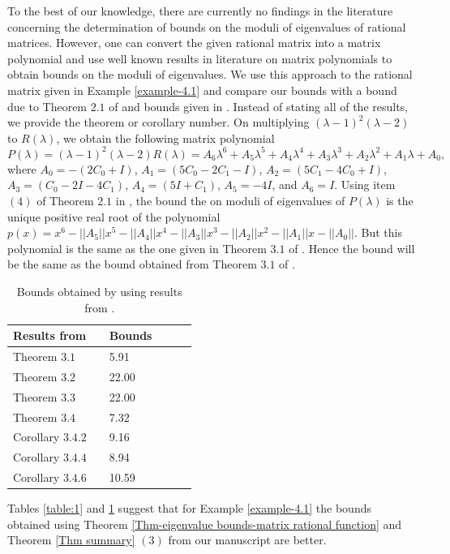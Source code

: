 \documentclass[12pt, reqno]{amsart}
\theoremstyle{definition}
\theoremstyle{remark}
\numberwithin{equation}{section}
\begin{document}
To the best of our knowledge, there are currently no findings in the 
literature concerning the determination of bounds on the moduli of eigenvalues 
of rational matrices. However, one can convert the given rational matrix into a 
matrix polynomial and use well known results in literature on matrix polynomials 
to obtain bounds on the moduli of eigenvalues. We use this approach to the 
rational matrix given in Example \ref{example-4.1} and compare our bounds with a 
bound due to Theorem $2.1$ of \cite{Bini} and bounds given in \cite{Le-Du-Nguyen}. 
Instead of stating all of the results, we provide the theorem or corollary number. 
On multiplying $(\lambda -1)^2 (\lambda-2)$ to $R(\lambda)$, 
we obtain the following matrix polynomial 
\begin{equation}
P(\lambda) = (\lambda -1)^2 (\lambda-2) R(\lambda)
= A_6\lambda^6 +A_5 \lambda^5 +A_4\lambda^4 + A_3\lambda^3 + A_2\lambda^2 +A_1\lambda+A_0,
\end{equation}
where $A_0 =-(2C_0+I)$, $A_1 =(5C_0-2C_1-I)$, $A_2 =(5C_1-4C_0+I)$, $A_3 =
(C_0-2I-4C_1)$, $A_4 =(5I+C_1)$, $A_5 =-4I$, and $A_6 =I$. 
Using item $(4)$ of Theorem $2.1$ in \cite{Bini}, the bound the on moduli of 
eigenvalues of $P(\lambda)$ is the unique positive real root of the polynomial 
$p(x) =x^6-||A_5|| x^5 -||A_4||x^4 - ||A_3||x^3 - ||A_2||x^2 -||A_1||x-||A_0||$. 
But this polynomial is the same as the one given in Theorem $3.1$ of \cite{Le-Du-Nguyen}. 
Hence the bound will be the same as the bound obtained from Theorem $3.1$ of 
\cite{Le-Du-Nguyen}.

\begin{table}[h!]
\centering
\begin{tabular}{l l l l l l}
\hline
Results from \cite{Le-Du-Nguyen} & \hspace{5cm} & Bounds\\ [0.5ex] 
\hline
Theorem $3.1$  & \hspace{5cm} & 5.91 \\
Theorem $3.2$  & \hspace{5cm} & 22.00 \\
Theorem $3.3$  & \hspace{5cm} & 22.00 \\
Theorem $3.4$  & \hspace{5cm} & 7.32 \\
Corollary $3.4.2$  & \hspace{5cm} & 9.16 \\
Corollary $3.4.4$  & \hspace{5cm} & 8.94 \\
Corollary $3.4.6$  & \hspace{5cm} & 10.59 \\[1ex]
\hline
\end{tabular}
\vspace{0.2cm}
\caption{Bounds obtained by using results from \cite{Le-Du-Nguyen}.}
\label{table:2}
\end{table} 
\noindent
Tables \ref{table:1} and \ref{table:2} suggest that for Example \ref{example-4.1} 
the bounds obtained using Theorem \ref{Thm-eigenvalue bounds-matrix rational function} 
and Theorem \ref{Thm summary} $(3)$ from our manuscript are better.
\end{document}
